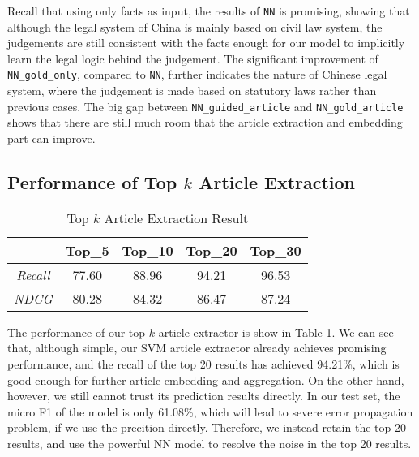 Recall that using only facts as input, the results of \texttt{NN} is promising, showing that although the legal system of China is mainly based on civil law system, the judgements are still consistent with the facts enough for our model to implicitly learn the legal logic behind the judgement.
The significant improvement of \texttt{NN\_gold\_only}, compared to \texttt{NN}, further indicates the nature of Chinese legal system, where the judgement is made based on statutory laws rather than previous cases. The big gap between \texttt{NN\_guided\_article} and \texttt{NN\_gold\_article} shows that there are still much room that the article extraction and embedding part can improve. 

\subsection{Performance of Top $k$ Article Extraction}
\begin{table}
\centering
\normalsize{
\begin{tabular}{|c|c|c|c|c|}
\hline
				& \textbf{Top\_5} 	& \textbf{Top\_10} 		& \textbf{Top\_20} 	& \textbf{Top\_30} \\
\hline
\textit{Recall} 		& 77.60			& 88.96  				& 94.21			& 96.53 	\\
\hline
\textit{NDCG} 		& 80.28			& 84.32  				& 86.47			& 87.24 	\\
\hline
\end{tabular}
}
\caption{Top $k$ Article Extraction Result}
\label{tab_article_extraction}
\end{table}

The performance of our top $k$ article extractor is show in Table \ref{tab_article_extraction}.
We can see that, although simple, our SVM article extractor already achieves promising performance, and the recall of the top 20 results has achieved 94.21\%, which is good enough for further article embedding and aggregation. 
On the other hand, however, we still cannot trust its prediction results directly.  In our test set, the micro F1 of the model is only 61.08\%, which will lead to severe error propagation problem, if we use the precition directly. Therefore, we instead retain the top 20 results, and use the powerful NN model to resolve the noise in the top 20 results.



